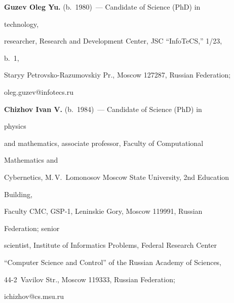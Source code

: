    


   \Contr


   


\noindent


\textbf{Guzev Oleg Yu.} (b.\ 1980)~--- Candidate of Science (PhD) in 


technology, 


researcher, Research and Development Center, JSC ``InfoTeCS,'' 1/23, 


b.~1, 


Staryy Petrovsko-Razumovskiy Pr., Moscow 127287, Russian Federation; 


\mbox{oleg.guzev@infotecs.ru}





\vspace*{3pt}





\noindent


\textbf{Chizhov Ivan V.} (b.\ 1984)~--- Candidate of Science (PhD) in 


physics 


and mathematics, associate professor, Faculty of Computational 


Mathematics and 


Cybernetics, M.\,V.~Lomonosov Moscow State University, 2nd Education 


Building, 


Faculty CMC, GSP-1, Leninskie Gory, Moscow 119991, Russian 


Federation; senior 


scientist, Institute of Informatics Problems, Federal Research Center 


``Computer Science and Control'' of the Russian Academy of Sciences,  


44-2~Vavilov Str., Moscow 119333, Russian Federation; 


\mbox{ichizhov@cs.msu.ru}





\label{end\stat}








\renewcommand{\bibname}{\protect\rm Литература}


